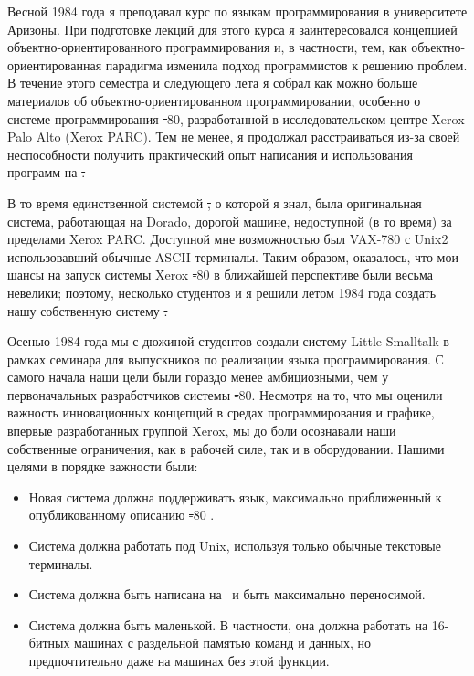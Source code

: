 

Весной 1984 года я преподавал курс по языкам программирования в университете Аризоны. 
При подготовке лекций для этого курса я заинтересовался концепцией объектно-ориентированного 
программирования и, в частности, тем, как объектно-ориентированная парадигма изменила 
подход программистов к решению проблем. В течение этого семестра и следующего лета я 
собрал как можно больше материалов об объектно-ориентированном программировании, 
особенно о системе программирования \st-80, разработанной в исследовательском 
центре Xerox Palo Alto (Xerox PARC). Тем не менее, я продолжал расстраиваться из-за 
своей неспособности получить практический опыт написания и использования программ на \st.

В то время единственной системой \st, о которой я знал, была оригинальная система, 
работающая на Dorado, дорогой машине, недоступной (в то время) за пределами Xerox PARC. 
Доступной мне возможностью был VAX-780 с Unix2 использовавший обычные ASCII терминалы. 
Таким образом, оказалось, что мои шансы на запуск системы Xerox \st-80 в 
ближайшей перспективе были весьма невелики; поэтому, несколько студентов и я 
решили летом 1984 года создать нашу собственную систему \st.

Осенью 1984 года мы с дюжиной студентов создали систему Little Smalltalk в рамках 
семинара для выпускников по реализации языка программирования. С самого начала наши 
цели были гораздо менее амбициозными, чем у первоначальных разработчиков системы 
\st-80. Несмотря на то, что мы оценили важность инновационных концепций в 
средах программирования и графике, впервые разработанных группой Xerox, мы до боли 
осознавали наши собственные ограничения, как в рабочей силе, так и в оборудовании. 
Нашими целями в порядке важности были:
\begin{itemize}[nosep]
    \item Новая система должна поддерживать язык, максимально приближенный к 
    опубликованному описанию \st-80 \cite{blue}.
    \item Система должна работать под Unix, используя только обычные текстовые терминалы.
    \item Система должна быть написана на \ci\ и быть максимально переносимой.
    \item Система должна быть маленькой. В частности, она должна работать на 
    16-битных машинах с раздельной памятью команд и данных, 
    но предпочтительно даже на машинах без этой функции.
\end{itemize}


